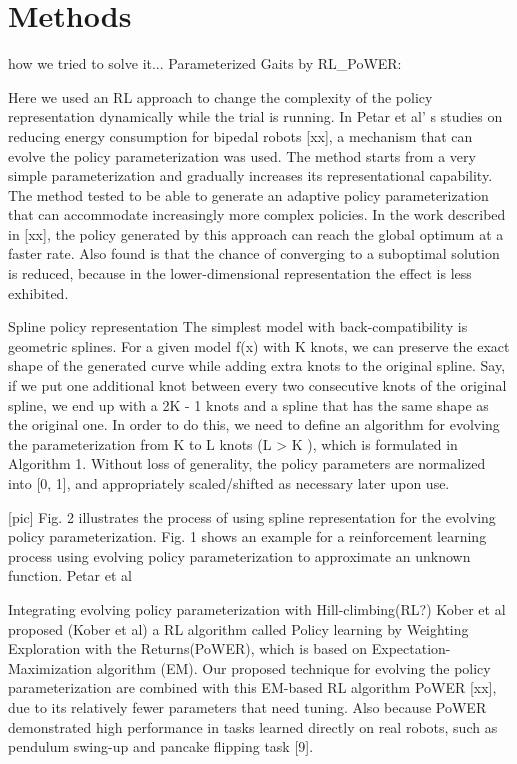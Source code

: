 \section{Methods}

how we tried to solve it...
Parameterized Gaits by RL_PoWER: 

Here we used an RL approach to change the complexity of the policy representation dynamically while the trial is running. In Petar et al’ s studies on reducing energy consumption for bipedal robots [xx], a mechanism that can evolve the policy parameterization was used. The method starts from a very simple parameterization and gradually increases its representational capability. The method tested to be able to generate an adaptive policy parameterization that can accommodate increasingly more complex policies. In the work described in [xx], the policy generated by this approach can reach the global optimum at a faster rate. Also found is that the chance of converging to a suboptimal solution is reduced, because in the lower-dimensional representation the effect is less exhibited. 

Spline policy representation
The simplest model with back-compatibility is geometric splines. For a given model f(x) with K knots, we can preserve the exact shape of the generated curve while adding extra knots to the original spline. Say, if we put one additional knot between every two consecutive knots of the original spline, we end up with a 2K - 1 knots and a spline that has the same shape as the original one. In order to do this, we need to define an algorithm for evolving the parameterization from K to L knots (L > K ), which is formulated in Algorithm 1.  Without loss of generality, the policy parameters are normalized into [0, 1], and appropriately scaled/shifted as necessary later upon use.

[pic]
Fig. 2 illustrates the process of using spline representation for the evolving policy parameterization. Fig. 1 shows an example for a reinforcement learning process using evolving policy parameterization to approximate an unknown function. Petar et al

Integrating evolving policy parameterization with Hill-climbing(RL?)
Kober et al  proposed (Kober et al) a RL algorithm called Policy learning by Weighting Exploration with the Returns(PoWER), which is based on Expectation-Maximization  algorithm (EM). Our proposed technique for evolving the policy parameterization are combined with this EM-based RL algorithm PoWER [xx], due to its relatively fewer parameters that need tuning. Also because PoWER demonstrated high performance in tasks learned directly on real robots, such as pendulum swing-up and pancake flipping task [9].

